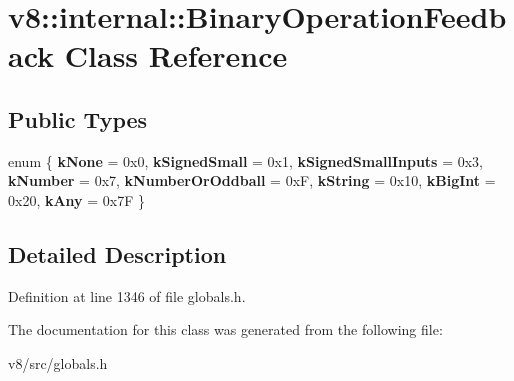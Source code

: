 \hypertarget{classv8_1_1internal_1_1BinaryOperationFeedback}{}\section{v8\+:\+:internal\+:\+:Binary\+Operation\+Feedback Class Reference}
\label{classv8_1_1internal_1_1BinaryOperationFeedback}
\subsection*{Public Types}
\begin{DoxyCompactItemize}
\item 
\mbox{\label{classv8_1_1internal_1_1BinaryOperationFeedback_a54c426147db1085f9912fe3c37826ec8}} 
enum \{ \newline
{\bfseries k\+None} = 0x0, 
{\bfseries k\+Signed\+Small} = 0x1, 
{\bfseries k\+Signed\+Small\+Inputs} = 0x3, 
{\bfseries k\+Number} = 0x7, 
\newline
{\bfseries k\+Number\+Or\+Oddball} = 0xF, 
{\bfseries k\+String} = 0x10, 
{\bfseries k\+Big\+Int} = 0x20, 
{\bfseries k\+Any} = 0x7F
 \}
\end{DoxyCompactItemize}


\subsection{Detailed Description}


Definition at line 1346 of file globals.\+h.



The documentation for this class was generated from the following file\+:\begin{DoxyCompactItemize}
\item 
v8/src/globals.\+h\end{DoxyCompactItemize}
